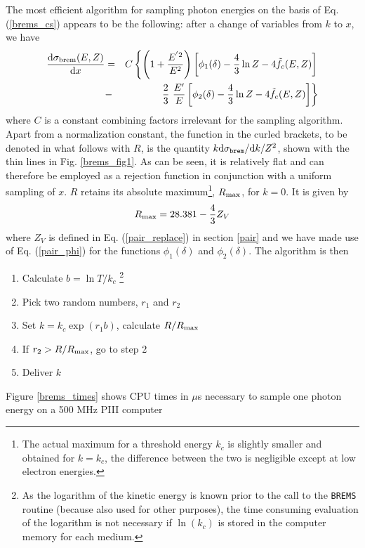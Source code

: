The most efficient algorithm for sampling photon energies on 
the basis of Eq. (\ref{brems_cs}) appears to be the following:
after a change of variables from $k$ to $x$, we have
\begin{eqnarray}
{{\rm d} \sigma_{\rm brem}(E,Z) \over {\rm d} x} & = & C 
\left\{ \left(1 + {E^{' 2} \over E^2} \right) 
\left[ \phi_1(\delta) - \frac{4}{3} \ln Z - 4 \tilde{f}_c(E,Z) \right] 
\right. \nonumber \\ & - & \left. 
\frac{2}{3}~\frac{E'}{E} \left[\phi_2(\delta) - 
\frac{4}{3} \ln Z - 4 \tilde{f}_c(E,Z) \right]
\right\}
\end{eqnarray}
where $C$ is a constant combining factors irrelevant for 
the sampling algorithm. Apart from a normalization 
constant, the function in the curled brackets, to be denoted 
in what follows with $R$, is the 
quantity $k {\rm d}\sigma_{\tt brem}/{\rm d}k/Z^2$, shown 
with the thin lines in Fig. \ref{brems_fig1}. As can be seen, 
it is relatively flat and can therefore be employed as a 
rejection function in conjunction with a uniform sampling 
of $x$. $R$ retains its absolute maximum\footnote{The actual maximum 
for a threshold energy 
$k_c$ is slightly smaller and obtained for $k=k_c$, the difference between the 
two is negligible except at low electron energies.}, $R_{\rm max}$, for 
$k = 0$. It is given by
\begin{equation}
R_{\rm max} = 28.381 - \frac{4}{3} Z_V
\end{equation}
where $Z_V$ is defined in Eq. (\ref{pair_replace}) in section \ref{pair} 
and we have made use of Eq. (\ref{pair_phi}) for the functions 
$\phi_1(\delta)$ and $\phi_2(\delta)$.
The algorithm is then
\begin{enumerate}
\item
Calculate $b = \ln T/k_c$ \footnote{As the logarithm of the kinetic 
energy is known prior to the call to the {\tt BREMS} routine 
(because also used for other purposes), the time consuming 
evaluation of the logarithm is not necessary if $\ln(k_c)$ is 
stored in the computer memory for each medium.}
\item
Pick two random numbers, $r_1$ and $r_2$
\item
Set $k = k_c \exp(r_1 b)$, calculate $R/R_{\rm max}$
\item
If $r_2 > R/R_{\rm max}$, go to step 2
\item
Deliver $k$
\end{enumerate}
Figure \ref{brems_times} shows CPU times in $\mu$s necessary to sample one 
photon energy on a 500 MHz PIII computer 
